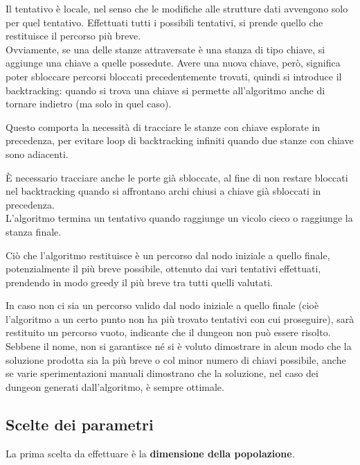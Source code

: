\documentclass[12pt,titlepage]{article}
\begin{document}
Il tentativo è locale, nel senso che le modifiche alle strutture dati avvengono solo per quel tentativo. Effettuati tutti i possibili tentativi, si prende quello che restituisce il percorso più breve.\\

\noindent Ovviamente, se una delle stanze attraversate è una stanza di tipo chiave, si aggiunge una chiave a quelle possedute. Avere una nuova chiave, però, significa poter sbloccare percorsi bloccati precedentemente trovati, quindi si introduce il backtracking: quando si trova una chiave si permette all'algoritmo anche di tornare indietro (ma solo in quel caso).

Questo comporta la necessità di tracciare le stanze con chiave esplorate in precedenza, per evitare loop di backtracking infiniti quando due stanze con chiave sono adiacenti.

È necessario tracciare anche le porte già sbloccate, al fine di non restare bloccati nel backtracking quando si affrontano archi chiusi a chiave già sbloccati in precedenza.\\

\noindent L'algoritmo termina un tentativo quando raggiunge un vicolo cieco o raggiunge la stanza finale.

Ciò che l'algoritmo restituisce è un percorso dal nodo iniziale a quello finale, potenzialmente il più breve possibile, ottenuto dai vari tentativi effettuati, prendendo in modo greedy il più breve tra tutti quelli valutati.

In caso non ci sia un percorso valido dal nodo iniziale a quello finale (cioè l'algoritmo a un certo punto non ha più trovato tentativi con cui proseguire), sarà restituito un percorso vuoto, indicante che il dungeon non può essere risolto.\\

\noindent Sebbene il nome, non si garantisce né si è voluto dimostrare in alcun modo che la soluzione prodotta sia la più breve o col minor numero di chiavi possibile, anche se varie sperimentazioni manuali dimostrano che la soluzione, nel caso dei dungeon generati dall'algoritmo, è sempre ottimale.

\subsection {Scelte dei parametri}

\noindent La prima scelta da effettuare è la \textbf{dimensione della popolazione}.
\end{document}
